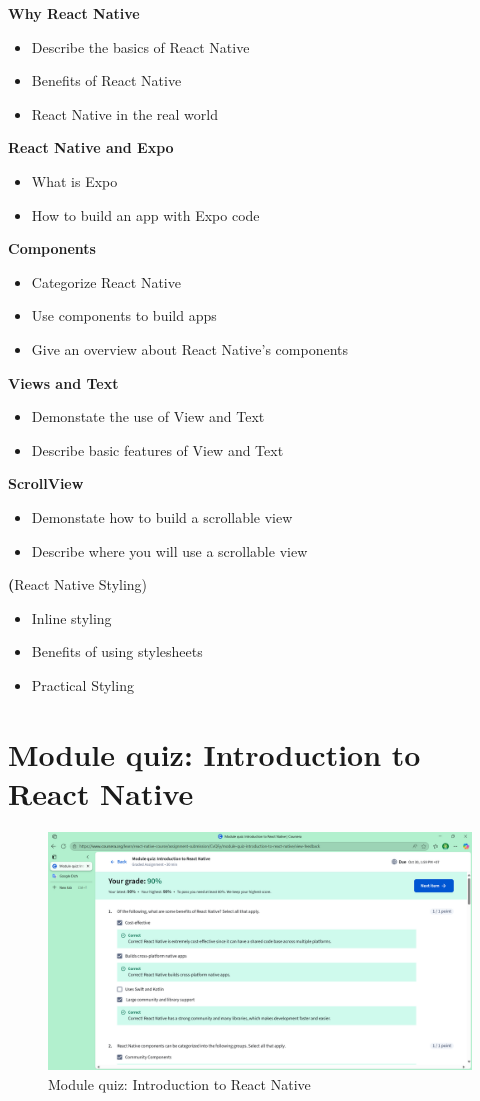 \textbf{Why React Native}
\begin{itemize}
  \item Describe the basics of React Native
  \item Benefits of React Native
  \item React Native in the real world
\end{itemize}

\textbf{React Native and Expo}
\begin{itemize}
  \item What is Expo
  \item How to build an app with Expo code
\end{itemize}

\textbf{Components}
\begin{itemize}
  \item Categorize React Native
  \item Use components to build apps
  \item Give an overview about React Native's components
\end{itemize}

\textbf{Views and Text}
\begin{itemize}
  \item Demonstate the use of View and Text
  \item Describe basic features of View and Text
\end{itemize}

\textbf{ScrollView}
\begin{itemize}
  \item Demonstate how to build a scrollable view
  \item Describe where you will use a scrollable view
\end{itemize}

\textbf(React Native Styling)
\begin{itemize}
  \item Inline styling
  \item Benefits of using stylesheets
  \item Practical Styling
\end{itemize}

\section{Module quiz: Introduction to React Native}
\begin{figure}[H]
  \centering
  \includegraphics[width=0.5\linewidth]{images/module-quiz-1.png}
  \caption{Module quiz: Introduction to React Native}
\end{figure}
